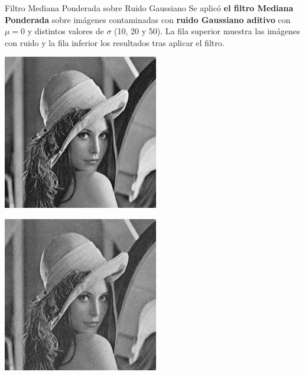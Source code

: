 \documentclass{beamer}
\begin{document}
\begin{frame}[fragile]{Filtro Mediana Ponderada sobre Ruido Gaussiano}
	\justifying
	\footnotesize
	Se aplicó \textcolor{unahurverde}{\textbf{el filtro Mediana Ponderada}} sobre imágenes contaminadas con \textcolor{unahurverde}{\textbf{ruido Gaussiano aditivo}}  
	con $\mu = 0$ y distintos valores de $\sigma$ (10, 20 y 50).  
	La fila superior muestra las imágenes con ruido y la fila inferior los resultados tras aplicar el filtro.
	
	\centering
	\begin{minipage}{0.25\linewidth}
		\centering
		\includegraphics[width=\linewidth]{../results/lena_gauss_sigma10}
	\end{minipage}\hfill
	\begin{minipage}{0.25\linewidth}
		\centering
		\includegraphics[width=\linewidth]{../results/lena_gauss_sigma20}

\end{minipage}
\end{frame}
\end{document}
